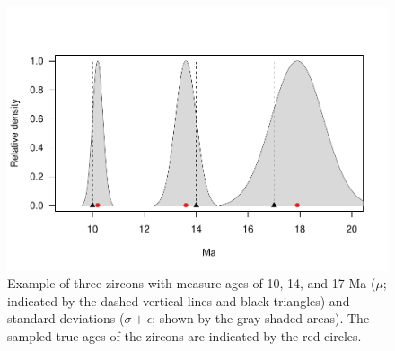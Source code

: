 \documentclass[12pt,letterpaper]{article}
\begin{document}
\begin{figure}[h!]
\centering
\includegraphics[width=120mm]{figs/ZirconAge.pdf}
\caption{Example of three zircons with measure ages of 10, 14, and 17 Ma ($\mu$; indicated by the dashed vertical lines and black triangles) and standard deviations ($\sigma + \epsilon$; shown by the gray shaded areas). The sampled true ages of the zircons are indicated by the red circles. }
\label{f_zir_age}
\end{figure}
\end{document}
